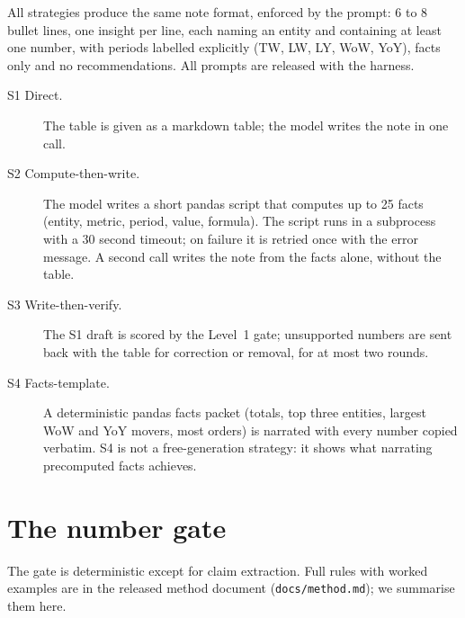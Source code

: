\documentclass[11pt]{article}
\begin{document}
All strategies produce the same note format, enforced by the prompt: 6 to 8 bullet lines, one insight per line, each naming an entity and containing at least one number, with periods labelled explicitly (TW, LW, LY, WoW, YoY), facts only and no recommendations. All prompts are released with the harness.

\begin{description}
  \item[S1 Direct.] The table is given as a markdown table; the model writes the note in one call.
  \item[S2 Compute-then-write.] The model writes a short pandas script that computes up to 25 facts (entity, metric, period, value, formula). The script runs in a subprocess with a 30 second timeout; on failure it is retried once with the error message. A second call writes the note from the facts alone, without the table.
  \item[S3 Write-then-verify.] The S1 draft is scored by the Level~1 gate; unsupported numbers are sent back with the table for correction or removal, for at most two rounds.
  \item[S4 Facts-template.] A deterministic pandas facts packet (totals, top three entities, largest WoW and YoY movers, most orders) is narrated with every number copied verbatim. S4 is not a free-generation strategy: it shows what narrating precomputed facts achieves.
\end{description}

\section{The number gate}
\label{sec:gate}

The gate is deterministic except for claim extraction. Full rules with worked examples are in the released method document (\texttt{docs/method.md}); we summarise them here.
\end{document}
